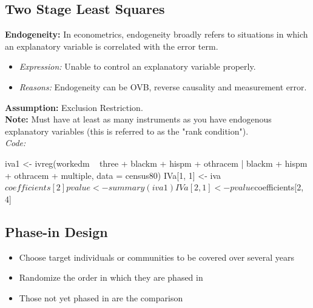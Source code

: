 \subsection*{Two Stage Least Squares}
\textbf{Endogeneity: }In econometrics, endogeneity broadly refers to situations in which an explanatory variable is correlated with the error term. 
\begin{itemize}
    \item \textit{Expression: }Unable to control an explanatory variable properly. 
    \item \textit{Reasons: }Endogeneity can be OVB, reverse causality and measurement error. 
\end{itemize}
\textbf{Assumption: }Exclusion Restriction. \\
\textbf{Note: }Must have at least as many instruments as you have endogenous explanatory variables (this is referred to as the "rank condition"). \\
\textit{Code: }
\begin{spverbatim}
iva1 <- ivreg(workedm ~ three + blackm + hispm + othracem |
                blackm + hispm + othracem + multiple, data = census80)
IVa[1, 1] <- iva$coefficients[2]
pvalue <- summary(iva1)
IVa[2, 1] <- pvalue$coefficients[2, 4]
\end{spverbatim}

\subsection*{Phase-in Design}
\begin{itemize}
    \item Choose target individuals or communities to be covered over several years
    \item Randomize the order in which they are phased in
    \item Those not yet phased in are the comparison
\end{itemize}
